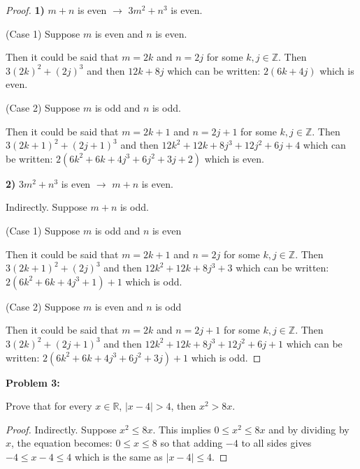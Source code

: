 \documentclass{article}
\begin{document}
    \begin{proof}
        \textbf{1)} $m+n$ is even $\rightarrow$ $3m^2+n^3$ is even.

        (Case 1) Suppose $m$ is even and $n$ is even.

        Then it could be said that $m = 2k$ and $n=2j$ for some $k,j\in\mathbb{Z}$. 
        Then $3(2k)^2 + (2j)^3$ and then $12k+8j$ which can be written: $2(6k+4j)$ which
        is even.

        (Case 2) Suppose $m$ is odd and $n$ is odd.

        Then it could be said that $m=2k+1$ and $n=2j+1$ for some $k,j\in\mathbb{Z}$.
        Then $3(2k+1)^2+(2j+1)^3$ and then $12k^2+12k+8j^3+12j^2+6j+4$ which can be written:
        $2(6k^2+6k+4j^3+6j^2+3j+2)$ which is even.

        \textbf{2)} $3m^2+n^3$ is even $\rightarrow$ $m+n$ is even.

        Indirectly. Suppose $m+n$ is odd. 

        (Case 1) Suppose $m$ is odd and $n$ is even

        Then it could be said that $m=2k+1$ and $n=2j$ for some $k,j\in\mathbb{Z}$.
        Then $3(2k+1)^2+(2j)^3$ and then $12k^2+12k+8j^3+3$ which can be written:
        $2(6k^2+6k+4j^3+1)+1$ which is odd.

        (Case 2) Suppose $m$ is even and $n$ is odd

        Then it could be said that $m=2k$ and $n=2j+1$ for some $k,j\in\mathbb{Z}$.
        Then $3(2k)^2+(2j+1)^3$ and then $12k^2+12k+8j^3+12j^2+6j+1$ which can be written:
        $2(6k^2+6k+4j^3+6j^2+3j)+1$ which is odd.
    \end{proof}


    \textbf{Problem 3:}

    Prove that for every $x\in\mathbb{R}$, $|x-4|>4$, then $x^2 > 8x$.

    \begin{proof}
        Indirectly. Suppose $x^2\leq 8x$. This implies $0\leq x^2\leq 8x$ and by dividing 
        by $x$, the equation becomes: $0\leq x \leq 8$ so that adding $-4$ to all sides gives
        $-4\leq x-4 \leq 4$ which is the same as $|x-4|\leq 4$.
    \end{proof}

\end{document}

